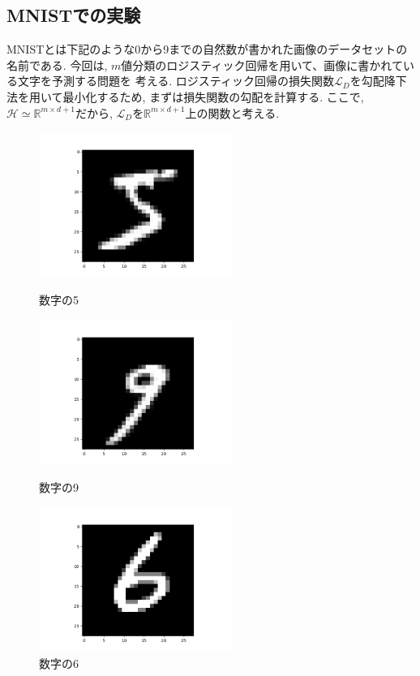 \documentclass[11pt, a4paper, dvipdfmx]{jsarticle}
\theoremstyle{definition}
\newcommand{\R}{\mathbb{R}}
\newcommand{\Hil}{\mathcal{H}}
\newcommand{\Loss}{\mathcal{L}_{D}}
\begin{document}
\subsection{MNISTでの実験}
MNISTとは下記のような0から9までの自然数が書かれた画像のデータセットの名前である. 
今回は, $m$値分類のロジスティック回帰を用いて、画像に書かれている文字を予測する問題を
考える. ロジスティック回帰の損失関数$\Loss$を勾配降下法を用いて最小化するため, まずは損失関数の勾配を計算する.
ここで, $\Hil\simeq\R^{m\times d + 1}$だから, $\Loss$を$\R^{m\times d + 1}$上の関数と考える.\
\begin{figure}[htbp]
    \begin{minipage}{0.32\hsize}
        \centering
        \includegraphics[width = 6.3cm]{MNIST_sample1.png}
        \caption{数字の5}
    \end{minipage}
    \begin{minipage}{0.32\hsize}
        \centering
        \includegraphics[width = 6.3cm]{MNIST_sample2.png}
        \caption{数字の9}
    \end{minipage}
    \begin{minipage}{0.32\hsize}
        \centering
        \includegraphics[width = 6.3cm]{MNIST_sample3.png}
        \caption{数字の6}
    \end{minipage}
\end{figure}
\end{document}
